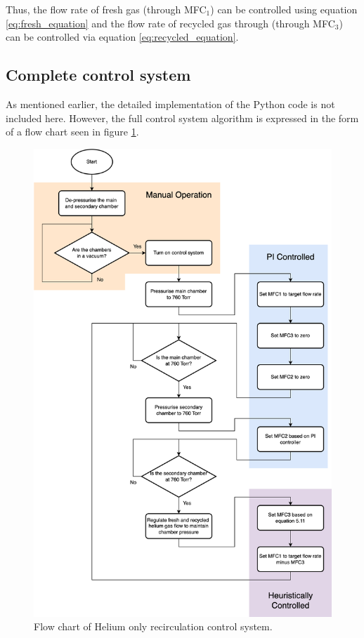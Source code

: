 Thus, the flow rate of fresh gas (through MFC$_1$) can be controlled using equation \ref{eq:fresh_equation} and the flow rate of recycled gas through (through MFC$_3$) can be controlled via equation \ref{eq:recycled_equation}. 




\subsection{Complete control system}

As mentioned earlier, the detailed implementation of the Python code is not included here. However, the full control system algorithm is expressed in the form of a flow chart seen in figure \ref{fig:he_controller_flow_chart}. 

\begin{figure}[h!]
	\centering
	\includegraphics[width=\linewidth, height=0.9\textheight]{chapter_5/figures/He_control_flow_chart.png}
	\caption{Flow chart of Helium only recirculation control system.}
	\label{fig:he_controller_flow_chart}
\end{figure}

